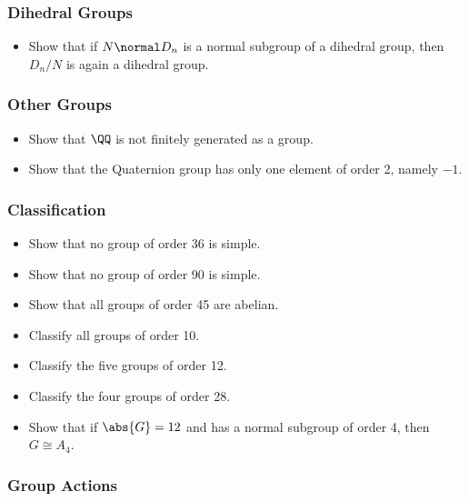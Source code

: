 \hypertarget{dihedral-groups}{%
\subsubsection{Dihedral Groups}\label{dihedral-groups}}

\begin{itemize}
\tightlist
\item
  Show that if \(N\normal D_n\) is a normal subgroup of a dihedral
  group, then \(D_n/N\) is again a dihedral group.
\end{itemize}

\hypertarget{other-groups}{%
\subsubsection{Other Groups}\label{other-groups}}

\begin{itemize}
\tightlist
\item
  Show that \(\QQ\) is not finitely generated as a group.
\item
  Show that the Quaternion group has only one element of order 2, namely
  \(-1\).
\end{itemize}

\hypertarget{classification}{%
\subsubsection{Classification}\label{classification}}

\begin{itemize}
\tightlist
\item
  Show that no group of order 36 is simple.
\item
  Show that no group of order 90 is simple.
\item
  Show that all groups of order 45 are abelian.
\item
  Classify all groups of order 10.
\item
  Classify the five groups of order 12.
\item
  Classify the four groups of order 28.
\item
  Show that if \(\abs{G} = 12\) and has a normal subgroup of order 4,
  then \(G \cong A_4\).
\end{itemize}

\hypertarget{group-actions-1}{%
\subsubsection{Group Actions}\label{group-actions-1}}

